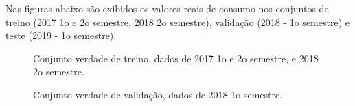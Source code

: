 \documentclass[	12pt, Times, openright, twoside, a4paper, english, brazil]{abntex2}
\begin{document}
                    Nas figuras abaixo são exibidos os valores reais de consumo nos conjuntos de treino (2017 1o e 2o semestre, 2018 2o semestre), validação (2018 - 1o semestre) e teste (2019 - 1o semestre).
                    \begin{figure}[!ht]
                    	\caption{Conjunto verdade de treino, dados de 2017 1o e 2o semestre, e 2018 2o semestre. \label{fig:case1_train} }
                    \end{figure}
                    \begin{figure}[!ht]
                    	\caption{Conjunto verdade de validação, dados de 2018 1o semestre. \label{fig:case1_val} }
                    \end{figure}
\end{document}
